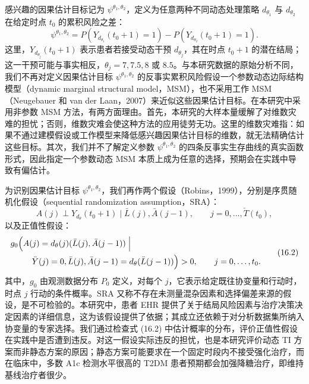 感兴趣的因果估计目标记为 $\psi^{\theta_1,\theta_2}$，定义为任意两种不同动态处理策略 $d_{\theta_1}$ 与 $d_{\theta_2}$ 在给定时点 $t_0$ 的累积风险之差：
\[
 \psi^{\theta_1,\theta_2}
 =P(Y_{d_{\theta_1}}(t_0+1)=1)-P(Y_{d_{\theta_2}}(t_0+1)=1).
\]
这里，$Y_{d_{\theta_j}}(t_0+1)$ 表示患者若接受动态干预 $d_{\theta_j}$，其在时点 $t_0+1$ 的潜在结局；这一干预可能与事实相反，$\theta_j=7,7.5,8$ 或 $8.5$。与本研究数据的原始分析不同，我们不再对定义因果估计目标 $\psi^{\theta_1,\theta_2}$ 的反事实累积风险假设一个参数动态边际结构模型（dynamic marginal structural model，MSM），也不采用工作 MSM（Neugebauer 和 van der Laan，2007）来近似这些因果估计目标。在本研究中采用非参数 MSM 方法，有两方面理由。首先，本研究的大样本量缓解了对维数灾难的担忧；否则，维数灾难会使这种方法的应用徒劳无功。这里的维数灾难指：如果不通过建模假设或工作模型来降低感兴趣因果估计目标的维数，就无法精确估计这些目标。其次，我们并不了解定义参数 $\psi^{\theta_1,\theta_2}$ 的四条反事实生存曲线的真实函数形式，因此指定一个参数动态 MSM 本质上成为任意的选择，预期会在实践中导致有偏估计。

为识别因果估计目标 $\psi^{\theta_1,\theta_2}$，我们再作两个假设（Robins，1999），分别是序贯随机化假设（sequential randomization assumption，SRA）：
\[
 A(j)\perp Y_{d_\theta}(t_0+1)\mid\bar L(j),\bar A(j-1),
 \qquad j=0,\ldots,\check T(t_0),
\]
以及正值性假设：
\begin{equation}
\begin{aligned}
 &g_0\Bigl(A(j)=d_\theta(j)(\bar L(j),\bar A(j-1))\Bigm|\\
 &\hspace{2.6em}\bar Y(j)=0,\bar L(j),
 \bar A(j-1)=d_\theta(\bar L(j-1))\Bigr)>0,
 \qquad j=0,\ldots,t_0.
\end{aligned}
\tag{16.2}
\end{equation}
其中，$g_0$ 由观测数据分布 $P_0$ 定义，对每个 $j$，它表示给定既往协变量和行动时，时点 $j$ 行动的条件概率。SRA 又称不存在未测量混杂因素和选择偏差来源的假设，是不可检验的。本研究中，患者 EHR 提供了关于结局风险因素与治疗决策决定因素的详细信息，这为该假设提供了依据；其成立还依赖于对分析数据集所纳入协变量的专家选择。我们通过检查式 (16.2) 中估计概率的分布，评价正值性假设在实践中是否遭到违反。对这一假设实际违反的担忧，也是本研究评价动态 TI 方案而非静态方案的原因；静态方案可能要求在一个固定时段内不接受强化治疗，而在临床中，多数 A1c 检测水平很高的 T2DM 患者预期都会加强降糖治疗，即维持基线治疗者很少。


